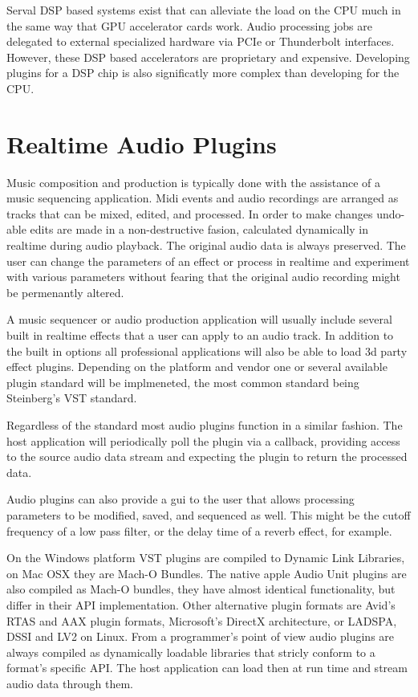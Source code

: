 Serval DSP based systems exist that can alleviate the load on the CPU much in the same way that GPU accelerator cards work. Audio processing jobs are delegated to external specialized hardware via PCIe or Thunderbolt interfaces. However, these DSP based accelerators are proprietary and expensive. Developing plugins for a DSP chip is also significatly more complex than developing for the CPU.

\section{Realtime Audio Plugins}

Music composition and production is typically done with the assistance of a music sequencing application. Midi events
 and audio recordings are arranged as tracks that can be mixed, edited, and processed. In order to make changes
 undo-able edits are made in a non-destructive fasion, calculated dynamically in realtime during audio playback. The
 original audio data is always preserved. The user can change the parameters of an effect or process in realtime and
 experiment with various parameters without fearing that the original audio recording might be permenantly altered.

A music sequencer or audio production application will usually include several built in realtime effects that a user
can apply to an audio track. In addition to the built in options all professional applications will also be able to
load 3d party effect plugins. Depending on the platform and vendor one or several available plugin standard will be
implmeneted, the most common standard being Steinberg's VST standard.

Regardless of the standard most audio plugins function in a similar fashion. The host application will periodically
poll the plugin via a callback, providing access to the source audio data stream and expecting the plugin to return the
 processed data.

Audio plugins can also provide a gui to the user that allows processing parameters to be modified, saved, and sequenced as well. This might be the cutoff frequency of a low pass filter, or the delay time of a reverb effect, for example.

 On the Windows platform VST plugins are compiled to Dynamic Link Libraries, on Mac OSX they are Mach-O Bundles. The native apple Audio Unit plugins are also compiled as Mach-O bundles, they have almost identical functionality, but differ in their API implementation. Other alternative plugin formats are Avid's RTAS and AAX plugin formats, Microsoft's DirectX architecture, or LADSPA, DSSI and LV2 on Linux. From a programmer's point of view audio plugins are always compiled as dynamically loadable libraries that stricly conform to a format's specific API. The host application can load then at run time and stream audio data through them.

